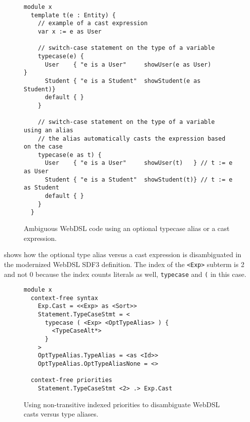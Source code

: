       \begin{figure}
        \begin{verbatim}
module x
  template t(e : Entity) {
    // example of a cast expression
    var x := e as User

    // switch-case statement on the type of a variable
    typecase(e) {
      User    { "e is a User"     showUser(e as User)      }
      Student { "e is a Student"  showStudent(e as Student)}
      default { }
    }

    // switch-case statement on the type of a variable using an alias
    // the alias automatically casts the expression based on the case
    typecase(e as t) {
      User    { "e is a User"     showUser(t)   } // t := e as User
      Student { "e is a Student"  showStudent(t)} // t := e as Student
      default { }
    }
  }
        \end{verbatim}
        \caption{\label{fig:sdf3-webdsl-typecase}Ambiguous WebDSL code using an optional typecase alias or a cast expression.}
      \end{figure}

       shows how the optional type alias versus a cast expression is disambiguated in the modernized WebDSL SDF3 definition. The index of the \texttt{<Exp>} subterm is 2 and not 0 because the index counts literals as well, \texttt{typecase} and \texttt{(} in this case.

      \begin{figure}
        \begin{verbatim}
module x
  context-free syntax
    Exp.Cast = <<Exp> as <Sort>>
    Statement.TypeCaseStmt = <
      typecase ( <Exp> <OptTypeAlias> ) {
        <TypeCaseAlt*>
      }
    >
    OptTypeAlias.TypeAlias = <as <Id>>
    OptTypeAlias.OptTypeAliasNone = <>

  context-free priorities
    Statement.TypeCaseStmt <2> .> Exp.Cast
        \end{verbatim}
        \caption{\label{fig:sdf3-typecase-disambiguation}Using non-transitive indexed priorities to disambiguate WebDSL casts versus type aliases.}
      \end{figure}
